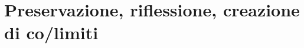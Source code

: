 \section{Preservazione, riflessione, creazione di co/limiti}
\begin{esercizi}
	\item \item \item \item \item
\end{esercizi}
